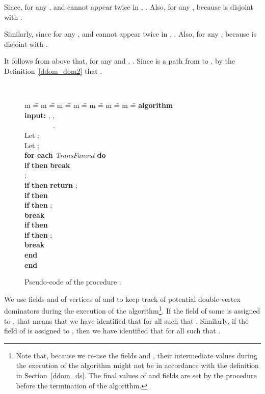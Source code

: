\documentclass{llncs}
\newcommand{\ALGORITHM}{\textbf{algorithm} }
\newcommand{\END}{\textbf{end} }
\newcommand{\DO}{\textbf{do} }
\newcommand{\FOREACH}{\textbf{for each} }
\newcommand{\IF}{\textbf{if} }
\newcommand{\RETURN}{\textbf{return} }
\newcommand{\THEN}{\textbf{then} }
\newcommand{\BREAK}{\textbf{break} }
\newcommand{\INPUT}{\textbf{input:} }
\begin{document}
Since, for any ,  and  cannot appear twice in  
, . Also, for any ,  because
 is disjoint with .

Similarly,  since for any ,   
and  cannot appear twice in  
, . Also, for any ,  because
 is disjoint with .

It follows from above that, for any  
and , . Since 
is a path from  to , by the Definition~\ref{ddom_dom2}
that .
\begin{flushright}
 \\
\end{flushright}


\begin{figure}[t!]
\begin{center}
\parbox{0cm} 
{
\begin{tabbing}
m \== m \== m \== m \== m \== m \== m \== \kill
\ALGORITHM  \\
\INPUT , ,\\
~~~~~~~~.\\

\> Let ;\\
\> Let ;\\
\> \FOREACH  {\em TransFanout} \DO  \\
\> \> \IF  \THEN \BREAK \\
\> \> ;\\
\> \> \IF  \THEN \RETURN ; \\
\> \> \IF  \THEN \\
\> \> \> \IF  \THEN ; \\
\> \> \> \BREAK \\
\> \> \IF  \THEN \\
\> \> \> \IF  \THEN ; \\
\> \> \> \BREAK \\
\> \END \\
\END
\end{tabbing}
}
\caption{Pseudo-code of the  procedure .}\label{ddom_code3}
\end{center}
\end{figure}

We use fields  and  of vertices of  and 
to keep track of potential double-vertex dominators during the execution of the algorithm\footnote{Note that, because we
re-use the fields  and , their intermediate values during the execution of the algorithm might not be
in accordance with the definition in Section~\ref{ddom_ds}. The final values of  and  fields are set by the procedure  before the termination of  the algorithm.}. 
If the field  of some   is assigned to , that means that we have identified that  for all  such that .
Similarly, if the field  of  is assigned to , then we have identified that 
 for all  such that .
\end{document}
